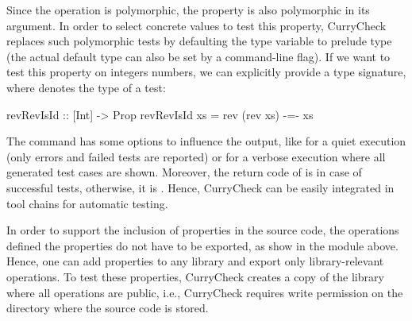 Since the operation  is polymorphic,
the property  is also polymorphic in its argument.
In order to select concrete values to test this property,
CurryCheck replaces such polymorphic tests by defaulting the type
variable to prelude type 
(the actual default type can also be set by a command-line flag).
If we want to test this property on integers numbers,
we can explicitly provide a type signature,
where  denotes the type of a test:
\begin{curry}
revRevIsId :: [Int] -> Prop
revRevIsId xs = rev (rev xs) -=- xs
\end{curry}
The command  has some options to influence
the output, like  for a quiet execution
(only errors and failed tests are reported) or
 for a verbose execution where all generated test cases
are shown.
Moreover, the return code of  is 
in case of successful tests, otherwise, it is .
Hence, CurryCheck can be easily integrated in tool chains
for automatic testing.

In order to support the inclusion of properties in the source code,
the operations defined the properties do not have to be exported,
as show in the module  above.
Hence, one can add properties to any library and export only
library-relevant operations. To test these properties,
CurryCheck creates a copy of the library where all operations
are public, i.e., CurryCheck requires write permission on the
directory where the source code is stored.

